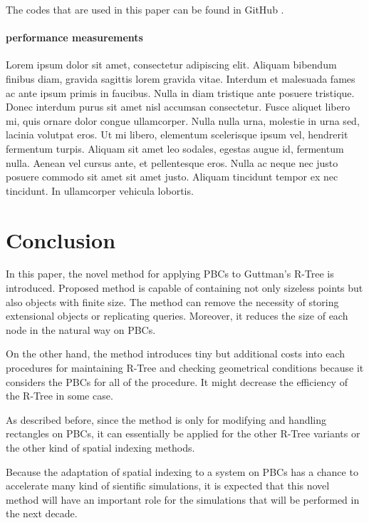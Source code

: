 \documentclass[10pt,letterpaper,twocolumn]{article}
\begin{document}
The codes that are used in this paper can be found in GitHub
\cite{periortree-implementation}.

\paragraph*{performance measurements}
Lorem ipsum dolor sit amet, consectetur adipiscing elit. Aliquam bibendum
finibus diam, gravida sagittis lorem gravida vitae. Interdum et malesuada fames
ac ante ipsum primis in faucibus. Nulla in diam tristique ante posuere
tristique. Donec interdum purus sit amet nisl accumsan consectetur. Fusce
aliquet libero mi, quis ornare dolor congue ullamcorper. Nulla nulla urna,
molestie in urna sed, lacinia volutpat eros. Ut mi libero, elementum scelerisque
ipsum vel, hendrerit fermentum turpis. Aliquam sit amet leo sodales, egestas
augue id, fermentum nulla. Aenean vel cursus ante, et pellentesque eros. Nulla
ac neque nec justo posuere commodo sit amet sit amet justo. Aliquam tincidunt
tempor ex nec tincidunt. In ullamcorper vehicula lobortis.

\section*{Conclusion}

In this paper, the novel method for applying PBCs to Guttman's R-Tree is
introduced. Proposed method is capable of containing not only sizeless points but also
objects with finite size. The method can remove the necessity of storing
extensional objects or replicating queries. Moreover, it reduces the size of
each node in the natural way on PBCs.

On the other hand, the method introduces tiny but additional costs into each
procedures for maintaining R-Tree and checking geometrical conditions because it
considers the PBCs for all of the procedure. It might decrease the efficiency of
the R-Tree in some case.

As described before, since the method is only for modifying and handling
rectangles on PBCs, it can essentially be applied for the other R-Tree variants
or the other kind of spatial indexing methods.

Because the adaptation of spatial indexing to a system on PBCs has a chance to
accelerate many kind of sientific simulations, it is expected that this novel
method will have an important role for the simulations that will be performed in
the next decade.


{}
\end{document}
